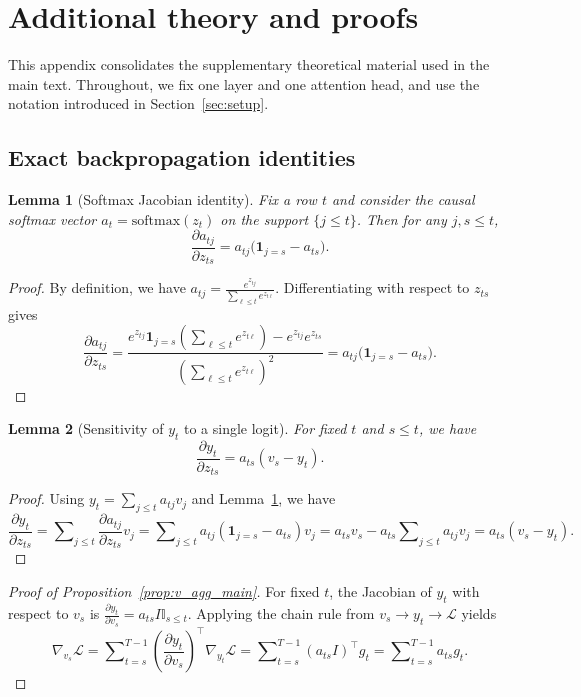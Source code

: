 \documentclass{article}
\theoremstyle{plain}
\newtheorem{lemma}{Lemma}
\theoremstyle{definition}
\theoremstyle{remark}
\begin{document}
\section{Additional theory and proofs}\label{app:theory}

This appendix consolidates the supplementary theoretical material used in the main text. Throughout, we fix one layer and one attention head, and use the notation introduced in Section~\ref{sec:setup}.

\subsection{Exact backpropagation identities}\label{app:theory:exact}

\begin{lemma}[Softmax Jacobian identity]\label{lem:softmax-jacobian-app}
Fix a row $t$ and consider the causal softmax vector $a_t = \mathrm{softmax}(z_t)$ on the support $\{j \le t\}$. Then for any $j,s \le t$,
\[
    \frac{\partial a_{tj}}{\partial z_{ts}} = a_{tj} \bigl(\mathbf{1}_{j=s} - a_{ts}\bigr).
\]
\end{lemma}
\begin{proof}
By definition, we have $a_{tj} = \frac{e^{z_{tj}}}{\sum\nolimits_{\ell \le t} e^{z_{t\ell}}}$. Differentiating with respect to $z_{ts}$ gives
\[
    \frac{\partial a_{tj}}{\partial z_{ts}}
    = \frac{e^{z_{tj}} \mathbf{1}_{j=s} \left(\sum\nolimits_{\ell \le t} e^{z_{t\ell}}\right) - e^{z_{tj}} e^{z_{ts}}}{\left(\sum\nolimits_{\ell \le t} e^{z_{t\ell}}\right)^2}
    = a_{tj} \bigl(\mathbf{1}_{j=s} - a_{ts}\bigr).
\]
\end{proof}

\begin{lemma}[Sensitivity of $y_t$ to a single logit]\label{lem:yt-logit-app}
For fixed $t$ and $s \le t$, we have
\[
    \frac{\partial y_t}{\partial z_{ts}} = a_{ts} (v_s - y_t).
\]
\end{lemma}
\begin{proof}
Using $y_t = \sum\nolimits_{j \le t} a_{tj} v_j$ and Lemma~\ref{lem:softmax-jacobian-app}, we have
\[
    \frac{\partial y_t}{\partial z_{ts}}
    = \sum\nolimits_{j \le t} \frac{\partial a_{tj}}{\partial z_{ts}} v_j
    = \sum\nolimits_{j \le t} a_{tj} (\mathbf{1}_{j=s} - a_{ts}) v_j
    = a_{ts} v_s - a_{ts} \sum\nolimits_{j \le t} a_{tj} v_j
    = a_{ts}(v_s - y_t).
\]
\end{proof}

\begin{proof}[Proof of Proposition~\ref{prop:v_agg_main}]
For fixed $t$, the Jacobian of $y_t$ with respect to $v_s$ is $\frac{\partial y_t}{\partial v_s} = a_{ts} I \mathbb{I}_{s\le t}$. Applying the chain rule from $v_s \to y_t \to \mathcal{L}$ yields
\[
    \nabla_{v_s} \mathcal{L}
    = \sum\nolimits_{t=s}^{T-1} \left(\frac{\partial y_t}{\partial v_s}\right)^\top \nabla_{y_t} \mathcal{L}
    = \sum\nolimits_{t=s}^{T-1} (a_{ts} I)^\top g_t
    = \sum\nolimits_{t=s}^{T-1} a_{ts} g_t.
\]
\end{proof}
\end{document}
